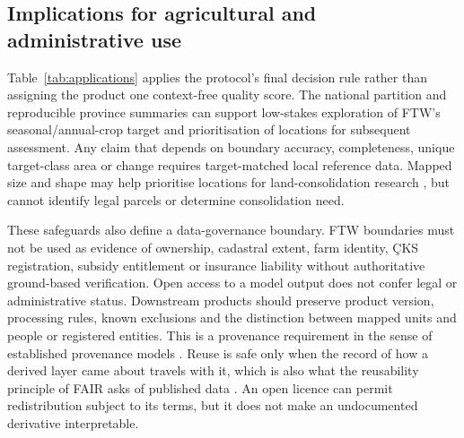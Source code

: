 \documentclass[pdflatex,sn-basic]{sn-jnl}
\begin{document}
\subsection{Implications for agricultural and administrative use}\label{subsec:implications}

Table~\ref{tab:applications} applies the protocol's final decision rule rather than assigning the product one context-free quality score. The national partition and reproducible province summaries can support low-stakes exploration of FTW's seasonal/annual-crop target and prioritisation of locations for subsequent assessment. Any claim that depends on boundary accuracy, completeness, unique target-class area or change requires target-matched local reference data. Mapped size and shape may help prioritise locations for land-consolidation research \citep{alturk_shape_2024,yilmaz_evaluating_2025,yilgan_impacts_2026}, but cannot identify legal parcels or determine consolidation need.

These safeguards also define a data-governance boundary. FTW boundaries must not be used as evidence of ownership, cadastral extent, farm identity, ÇKS registration, subsidy entitlement or insurance liability without authoritative ground-based verification. Open access to a model output does not confer legal or administrative status. Downstream products should preserve product version, processing rules, known exclusions and the distinction between mapped units and people or registered entities. This is a provenance requirement in the sense of established provenance models \citep{missier_w3c_2013}. Reuse is safe only when the record of how a derived layer came about travels with it, which is also what the reusability principle of FAIR asks of published data \citep{wilkinson_fair_2016}. An open licence can permit redistribution subject to its terms, but it does not make an undocumented derivative interpretable.
\end{document}
